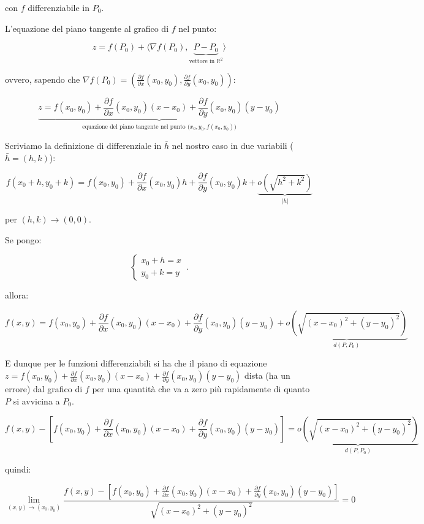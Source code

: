 \documentclass[11pt]{article}
\begin{document}
con $f$ differenziabile in $P_0$.

L'equazione del piano tangente al grafico di $f$ nel punto:

\[
    z= f(P_0) + \langle \nabla f(P_0), \underbrace{P-P_0}_\text{vettore in $\mathbb{R}^{2}$} \rangle
\]

ovvero, sapendo che $\nabla f(P_0) = ( \frac{\partial f}{\partial x}(x_0,y_0), \frac{\partial f}{\partial y}(x_0,y_0))$:

\[
    \underbrace{z = f(x_0,y_0) + \frac{\partial f}{\partial x}(x_0,y_0) (x-x_0) + \frac{\partial f}{\partial y}(x_0,y_0) (y-y_0)}_\text{equazione del piano tangente nel punto ($x_0,y_0,f(x_0,y_0)$)}
\]


Scriviamo la definizione di differenziale in $\bar{h} $ nel nostro caso in due variabili ($\bar{h} =(h,k)$):

\[
    f(x_0+h,y_0+k) = f(x_0,y_0) + \frac{\partial f}{\partial x}(x_0,y_0) h + \frac{\partial f}{\partial y}(x_0,y_0) k + \underbrace{o(\sqrt{h^{2}+k^{2}})}_\text{$|h|$}
\]

per $(h,k) \rightarrow  (0,0)$.

Se pongo:

\begin{equation}
    \begin{cases}
           x_0+h = x\\
           y_0+ k = y
    \end{cases}\,.
\end{equation}

allora:

\[
    f(x,y) = f(x_0,y_0) + \frac{\partial f}{\partial x}(x_0,y_0) (x-x_0) + \frac{\partial f}{\partial y}(x_0,y_0) (y-y_0) + \underbrace{o(\sqrt{(x-x_0)^{2}+(y-y_0)^{2}})}_\text{$d(P,P_0)$}
\]

E dunque per le funzioni differenziabili si ha che il piano di equazione $z= f(x_0,y_0) + \frac{\partial f}{\partial x}(x_0,y_0)(x-x_0) + \frac{\partial f}{\partial y}(x_0,y_0) (y-y_0)$ dista (ha un errore) dal grafico di $f$ per una quantità che va a zero più rapidamente di quanto $P$ si avvicina a $P_0$.

\[
    f(x,y) - [f(x_0,y_0) + \frac{\partial f}{\partial x}(x_0,y_0) (x-x_0) + \frac{\partial f}{\partial y}(x_0,y_0) (y-y_0)] = \underbrace{o(\sqrt{(x-x_0)^{2}+(y-y_0)^{2}})}_\text{$d(P,P_0)$}
\]

quindi:

\[
    \lim_{ (x,y) \to (x_0,y_0) } \frac{f(x,y) - [f(x_0,y_0) + \frac{\partial f}{\partial x}(x_0,y_0) (x-x_0) + \frac{\partial f}{\partial y}(x_0,y_0) (y-y_0)] }{\sqrt{(x-x_0)^{2}+(y-y_0)^{2}}}= 0
\]
\end{document}
